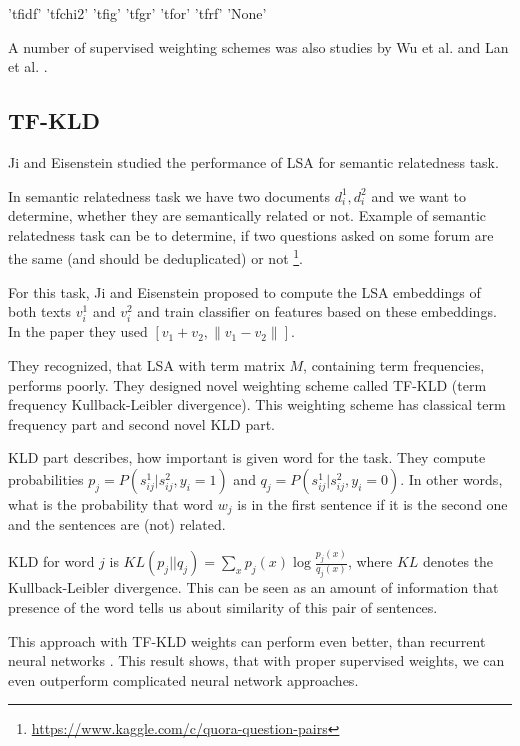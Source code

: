         'tfidf'
'tfchi2'
'tfig'
'tfgr'
'tfor'
'tfrf'
'None'

    
    
    A number of supervised weighting schemes was also studies by Wu et al. \cite{wu2017balancing} %
    and Lan et al. \cite{lan2009supervised}. %


    \subsection{TF-KLD}
        Ji and Eisenstein \cite{ji2013discriminative} %
        studied the performance of LSA for semantic relatedness task.
        
        In semantic relatedness task we have two documents $d_i^1, d_i^2$ and we want to determine, whether they are semantically related or not. 
        Example of semantic relatedness task can be to determine, if two questions asked on some forum are the same (and should be deduplicated) or not \footnote{\url{https://www.kaggle.com/c/quora-question-pairs}}.
        
        For this task, Ji and Eisenstein proposed to compute the LSA embeddings of both texts $v_i^1$ and $v_i^2$ and train classifier on features based on these embeddings.
        In the paper they used $[v_1 + v_2, \| v_1- v_2 \|]$.
        
        They recognized, that LSA with term matrix $M$, containing term frequencies, performs poorly. 
        They designed novel weighting scheme called TF-KLD (term frequency Kullback-Leibler divergence). 
        This weighting scheme has classical term frequency part and second novel KLD part.
        
        KLD part describes, how important is given word for the task.
        They compute probabilities $p_j = P(s_{ij}^1| s_{ij}^2, y_i=1)$ and $q_j = P(s_{ij}^1| s_{ij}^2, y_i=0)$.
        In other words, what is the probability that word $w_j$ is in the first sentence if it is the second one and the sentences are (not) related.
        
        KLD for word $j$ is $KL(p_j || q_j) = \sum_x p_j(x) \log \frac{p_j(x)}{q_j(x)}$, where $KL$ denotes the Kullback-Leibler divergence.
        This can be seen as an amount of information that presence of the word tells us about similarity of this pair of sentences. 
    
        This approach with TF-KLD weights can perform even better, than recurrent neural networks \cite{conneau2017supervised}.
        This result shows, that with proper supervised weights, we can even outperform complicated neural network approaches.
        

